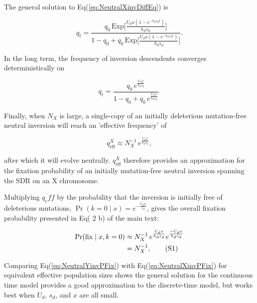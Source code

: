 \documentclass{article}
\newcommand\hl[1]{%
  \bgroup
  \hskip0pt\color{blue!80!black}%
  #1%
  \egroup
}
\newcommand\numberthis{\addtocounter{equation}{1}\tag{\theequation}}
\begin{document}
\noindent The general solution to Eq(\ref{eq:NeutralXinvDiffEq}) is

\begin{equation}\label{eq:NeutralXinvGenSol}
	q_{t} = \frac{q_{0} \, \text{Exp}\big[ \frac{U_d x(1 - e^{-h_d s_d t})}{h_d s_d } \big]} {1 - q_{0} + q_0 \, \text{Exp} \big[ \frac{U_d x(1 - e^{-h_d s_d t})}{h_d s_d } \big]}.
\end{equation} 

\noindent In the long term, the frequency of inversion descendents converges deterministically on 

\begin{equation}\label{eq:NeutralXinvqEff}
	q_{t} = \frac{q_{0} \, e^{\frac{U_d x}{h_d s_d }}} {1 - q_{0} + q_0 \, e^{\frac{U_d x}{h_d s_d }}}.
\end{equation} 

\noindent Finally, when $N_X$ is large, a single-copy of an initially deleterious mutation-free neutral inversion will reach an 'effective frequency' of

\begin{equation}\label{eq:NeutralXinvQEff}
	q^X_{\text{eff}} \approx N^{-1}_X \, e^{\frac{U_d x}{h_d s_d }},
\end{equation} 

\noindent after which it will evolve neutrally. $q^X_{\text{eff}}$ therefore provides an approximation for the fixation probability of an initially mutation-free neutral inversion spanning the SDR on an X chromosome. 

Multiplying $q_eff$ by the probability that the inversion is initially free of deleterious mutations, $\Pr(k = 0 \mid x) = e^{-\frac{U_d x}{s_d}}$, gives the overall fixation probability presented in Eq(\hl{2}b) of the main text:

\begin{align*}\label{eq:NeutralXinvPFix}
		\Pr(\text{fix} \mid x, k = 0) &\approx N^{-1}_X \, e^{\frac{U_d x}{h_d s_d}} e^{\frac{-U_d x}{h_d s_d}} \\
		&= N^{-1}_X, \numberthis
\end{align*}

Comparing Eq(\ref{eq:NeutralYinvPFix}) with Eq(\ref{eq:NeutralXinvPFix}) for equivalent effective population sizes shows the general solution for the continuous time model provides a good approximation to the discrete-time model, but works best when $U_d$, $s_d$, and $x$ are all small. 

\newpage{}
\end{document}
